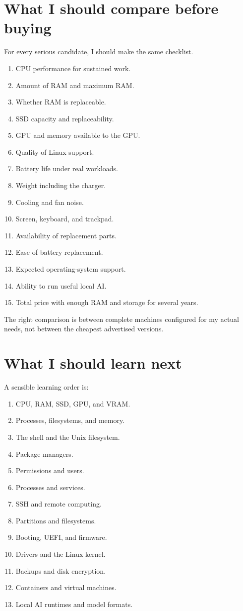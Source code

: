 \section{What I should compare before buying}
\label{section-computing-systems-buying}

For every serious candidate, I should make
the same checklist.

\begin{enumerate}
\item CPU performance for sustained work.
\item Amount of RAM and maximum RAM.
\item Whether RAM is replaceable.
\item SSD capacity and replaceability.
\item GPU and memory available to the GPU.
\item Quality of Linux support.
\item Battery life under real workloads.
\item Weight including the charger.
\item Cooling and fan noise.
\item Screen, keyboard, and trackpad.
\item Availability of replacement parts.
\item Ease of battery replacement.
\item Expected operating-system support.
\item Ability to run useful local AI.
\item Total price with enough RAM and
storage for several years.
\end{enumerate}

The right comparison is between complete
machines configured for my actual needs,
not between the cheapest advertised
versions.

\section{What I should learn next}
\label{section-computing-systems-next}

A sensible learning order is:

\begin{enumerate}
\item CPU, RAM, SSD, GPU, and VRAM.
\item Processes, filesystems, and memory.
\item The shell and the Unix filesystem.
\item Package managers.
\item Permissions and users.
\item Processes and services.
\item SSH and remote computing.
\item Partitions and filesystems.
\item Booting, UEFI, and firmware.
\item Drivers and the Linux kernel.
\item Backups and disk encryption.
\item Containers and virtual machines.
\item Local AI runtimes and model formats.
\end{enumerate}

